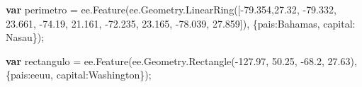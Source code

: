 \documentclass[
  12pt,
  letterpaper,
  twoside]{book}
\newenvironment{Shaded}{\begin{snugshade}}{\end{snugshade}}
\newcommand{\AttributeTok}[1]{\textcolor[rgb]{0.48,0.12,0.64}{#1}}
\newcommand{\ControlFlowTok}[1]{\textcolor[rgb]{0.00,0.00,0.00}{\textbf{#1}}}
\newcommand{\DataTypeTok}[1]{\textcolor[rgb]{0.00,0.00,0.00}{#1}}
\newcommand{\FloatTok}[1]{\textcolor[rgb]{0.28,0.53,0.93}{#1}}
\newcommand{\FunctionTok}[1]{\textcolor[rgb]{0.48,0.12,0.64}{#1}}
\newcommand{\KeywordTok}[1]{\textcolor[rgb]{0.48,0.12,0.64}{#1}}
\newcommand{\NormalTok}[1]{#1}
\newcommand{\OperatorTok}[1]{\textcolor[rgb]{0.00,0.00,0.00}{#1}}
\newcommand{\StringTok}[1]{\textcolor[rgb]{0.87,0.29,0.22}{#1}}
\begin{document}
\begin{Shaded}
\begin{Highlighting}[]
\ControlFlowTok{var}\NormalTok{ perimetro }\OperatorTok{=} \KeywordTok{ee}\OperatorTok{.}\FunctionTok{Feature}\NormalTok{(}\KeywordTok{ee}\OperatorTok{.}\AttributeTok{Geometry}\OperatorTok{.}\FunctionTok{LinearRing}\NormalTok{([}\OperatorTok{{-}}\FloatTok{79.354}\OperatorTok{,}\FloatTok{27.32}\OperatorTok{,}
                                   \OperatorTok{{-}}\FloatTok{79.332}\OperatorTok{,} \FloatTok{23.661}\OperatorTok{,}
                                   \OperatorTok{{-}}\FloatTok{74.19}\OperatorTok{,} \FloatTok{21.161}\OperatorTok{,}
                                 \OperatorTok{{-}}\FloatTok{72.235}\OperatorTok{,} \FloatTok{23.165}\OperatorTok{,}
                                   \OperatorTok{{-}}\FloatTok{78.039}\OperatorTok{,} \FloatTok{27.859}\NormalTok{])}\OperatorTok{,}
\NormalTok{        \{}\DataTypeTok{pais}\OperatorTok{:}\StringTok{\textquotesingle{}Bahamas\textquotesingle{}}\OperatorTok{,}
      \DataTypeTok{capital}\OperatorTok{:} \StringTok{\textquotesingle{}Nasau\textquotesingle{}}\NormalTok{\})}\OperatorTok{;}

\ControlFlowTok{var}\NormalTok{ rectangulo }\OperatorTok{=} \KeywordTok{ee}\OperatorTok{.}\FunctionTok{Feature}\NormalTok{(}\KeywordTok{ee}\OperatorTok{.}\AttributeTok{Geometry}\OperatorTok{.}\FunctionTok{Rectangle}\NormalTok{(}\OperatorTok{{-}}\FloatTok{127.97}\OperatorTok{,} \FloatTok{50.25}\OperatorTok{,}
                                  \OperatorTok{{-}}\FloatTok{68.2}\OperatorTok{,} \FloatTok{27.63}\NormalTok{)}\OperatorTok{,}
\NormalTok{        \{}\DataTypeTok{pais}\OperatorTok{:}\StringTok{\textquotesingle{}eeuu\textquotesingle{}}\OperatorTok{,} 
      \DataTypeTok{capital}\OperatorTok{:}\StringTok{\textquotesingle{}Washington\textquotesingle{}}\NormalTok{\})}\OperatorTok{;} 


\end{Highlighting}
\end{Shaded}
\end{document}
